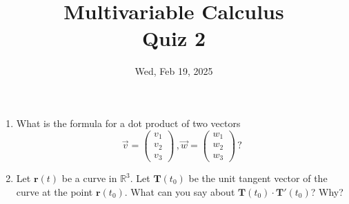 \documentclass[aspectratio=169]{beamer}
\title{ Multivariable Calculus \\ Quiz 2}
\institute{Fulbright University Vietnam}
\date{Wed, Feb 19, 2025}
\begin{document}
\maketitle

\begin{frame}
	\begin{enumerate}
		\item What is the formula for a dot product of two vectors
		      \begin{equation*}
			      \vec{v} = \begin{pmatrix}
				      v_1 \\ v_2 \\ v_3
			      \end{pmatrix} \,,
			      \vec{w} = \begin{pmatrix}
				      w_1 \\ w_2 \\ w_3
			      \end{pmatrix} \,?
		      \end{equation*}

		\item Let $\mathbf{r}(t)$ be a curve in $\mathbb{R}^3$. Let $\mathbf{T}(t_0)$ be the unit tangent vector of the curve at the point $\mathbf{r}(t_0)$.
		      What can you say about $\mathbf{T}(t_0) \cdot \mathbf{T}'(t_0)$? Why?
	\end{enumerate}
\end{frame}
\end{document}

